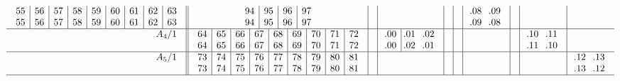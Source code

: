 \documentclass[12pt,a4paper]{amsart}
\begin{document}
\begin{align*}
\begin{array}{r||c|c|c|c|c|c|c|c|c}
\begin{array}{c|c|c|c|c|c|c|c|c}
55&56&57&58&59&60&61&62&63\\
55&56&57&58&59&60&61&62&63\\
  \end{array}
&
   \begin{array}{c|c|c|c}
94&95&96&97\\
94&95&96&97\\
   \end{array}
&&&&&
    \begin{array}{cc}
\llap.08&\llap.09\\
\llap.09&\llap.08\\
    \end{array}
&& \\\hline
    \begin{array}{r}
      A_4/1 \\ \\
    \end{array}
&
  \begin{array}{c|c|c|c|c|c|c|c|c}
64&65&66&67&68&69&70&71&72\\
64&65&66&67&68&69&70&71&72\\
  \end{array}
&&
    \begin{array}{c|cc}
\llap.00&\llap.01&\llap.02\\
\llap.00&\llap.02&\llap.01\\
    \end{array}
&&&&&
    \begin{array}{cc}
\llap.10&\llap.11\\
\llap.11&\llap.10\\
    \end{array}
& \\\hline
    \begin{array}{r}
      A_5/1 \\ \\
    \end{array}
&
  \begin{array}{c|c|c|c|c|c|c|c|c}
73&74&75&76&77&78&79&80&81\\
73&74&75&76&77&78&79&80&81\\
  \end{array}
&&&&&&&&
    \begin{array}{cc}
\llap.12&\llap.13\\
\llap.13&\llap.12\\
    \end{array}
 \\\hline
  \end{array}
\end{align*}
\end{document}
